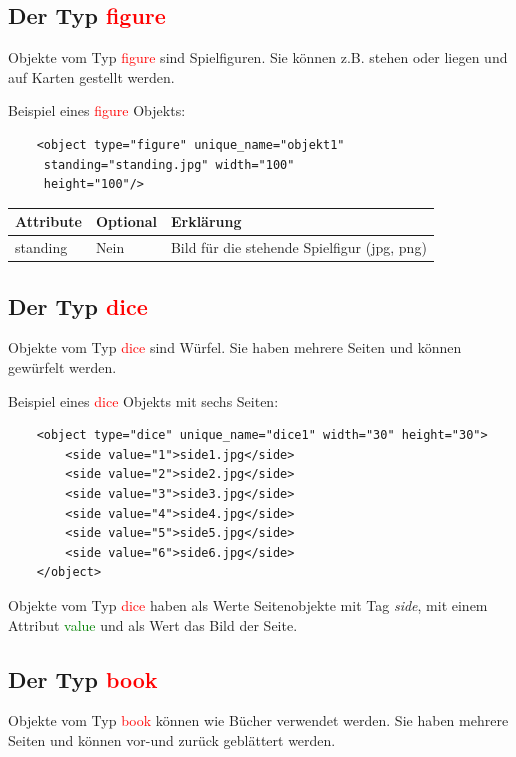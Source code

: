 \documentclass[ngerman]{scrbook}
\newcommand{\gamefigure}{\textcolor{red}{figure}\xspace}
\newcommand{\dice}{\textcolor{red}{dice}\xspace}
\newcommand{\book}{\textcolor{red}{book}\xspace}
\newcommand{\xmlattribute}[1]{\textcolor{green}{#1}}
\begin{document}
	\subsection{Der Typ \gamefigure}
	Objekte vom Typ \gamefigure sind Spielfiguren. Sie können z.B. stehen oder liegen und auf Karten gestellt werden.

	Beispiel eines \gamefigure Objekts:
	
	\lstset{language=XML}
	\begin{lstlisting}	
	<object type="figure" unique_name="objekt1"
	 standing="standing.jpg" width="100" 
	 height="100"/>
	\end{lstlisting}
	

	\begin{table}[!h]
		\renewcommand{\arraystretch}{1.5}
		\begin{tabularx}{\textwidth}{XXX}
			Attribute & Optional & Erklärung\\\hline
			standing & Nein & Bild für die stehende Spielfigur (jpg, png)
		\end{tabularx}
	\end{table}


	\subsection{Der Typ \dice}
	Objekte vom Typ \dice sind Würfel. Sie haben mehrere Seiten und können gewürfelt werden.

	Beispiel eines \dice Objekts mit sechs Seiten:
	
	\lstset{language=XML}
	\begin{lstlisting}	
	<object type="dice" unique_name="dice1" width="30" height="30">
		<side value="1">side1.jpg</side>
		<side value="2">side2.jpg</side>
		<side value="3">side3.jpg</side>
		<side value="4">side4.jpg</side>
		<side value="5">side5.jpg</side>
		<side value="6">side6.jpg</side>
	</object>
	\end{lstlisting}
	
	Objekte vom Typ \dice haben als Werte Seitenobjekte mit Tag \textit{side}, mit einem Attribut \xmlattribute{value} und als Wert das Bild der Seite.

	\subsection{Der Typ \book}
	Objekte vom Typ \book können wie Bücher verwendet werden. Sie haben mehrere Seiten und können vor-und zurück geblättert werden.
	
\end{document}
